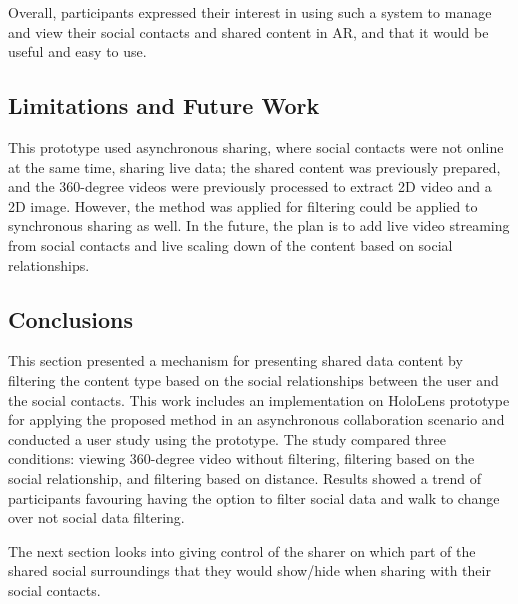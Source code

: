 Overall, participants expressed their interest in using such a system to manage and view their social contacts and shared content in AR, and that it would be useful and easy to use. 

\subsection{Limitations and Future Work}

This prototype used asynchronous sharing, where social contacts were not online at the same time, sharing live data; the shared content was previously prepared, and the 360-degree videos were previously processed to extract 2D video and a 2D image. However, the method was applied for filtering could be applied to synchronous sharing as well. In the future, the plan is to add live video streaming from social contacts and live scaling down of the content based on social relationships. 



\subsection{Conclusions}

This section presented a mechanism for presenting shared data content by filtering the content type based on the social relationships between the user and the social contacts. This work includes an implementation on HoloLens prototype for applying the proposed method in an asynchronous collaboration scenario and conducted a user study using the prototype. The study compared three conditions: viewing 360-degree video without filtering, filtering based on the social relationship, and filtering based on distance. Results showed a trend of participants favouring having the option to filter social data and walk to change over not social data filtering. 

The next section looks into giving control of the sharer on which part of the shared social surroundings that they would show/hide when sharing with their social contacts. 
